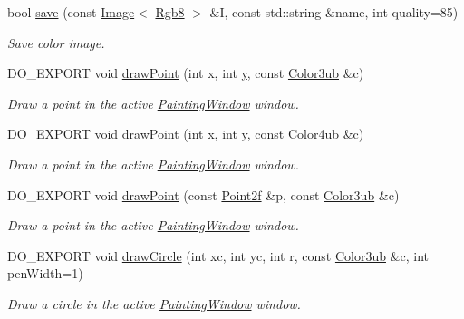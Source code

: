 \begin{DoxyCompactItemize}
bool \hyperlink{group___image_i_o_ga7aae26b551495f7b9992a69d6d80a9c0}{save} (const \hyperlink{class_d_o_1_1_image}{Image}$<$ \hyperlink{group___color_types_gabba376766e70e08cdaccf69fa903f526}{Rgb8} $>$ \&I, const std\-::string \&name, int quality=85)
\begin{DoxyCompactList}\small\item\em Save color image. \end{DoxyCompactList}\item 
D\-O\-\_\-\-E\-X\-P\-O\-R\-T void \hyperlink{group___draw2_d_gac5a7d7f69f27b67a54658d70fd2ecf92}{draw\-Point} (int x, int \hyperlink{group___channel_accessors_gac90c52c5b3a7b2a7e3761e6e84f25778}{y}, const \hyperlink{group___color_types_ga018b76cd00a4f9dca7dd06246d5bd3aa}{Color3ub} \&c)
\begin{DoxyCompactList}\small\item\em Draw a point in the active \hyperlink{class_d_o_1_1_painting_window}{Painting\-Window} window. \end{DoxyCompactList}\item 
D\-O\-\_\-\-E\-X\-P\-O\-R\-T void \hyperlink{group___draw2_d_ga404236e564421c6870b162167e459491}{draw\-Point} (int x, int \hyperlink{group___channel_accessors_gac90c52c5b3a7b2a7e3761e6e84f25778}{y}, const \hyperlink{group___color_types_ga546db612644ff4dcb8989ae595ec64f9}{Color4ub} \&c)
\begin{DoxyCompactList}\small\item\em Draw a point in the active \hyperlink{class_d_o_1_1_painting_window}{Painting\-Window} window. \end{DoxyCompactList}\item 
D\-O\-\_\-\-E\-X\-P\-O\-R\-T void \hyperlink{group___draw2_d_gafd722a4bc47cf9ce5110ee6b639b2b3f}{draw\-Point} (const \hyperlink{group___eigen_typedefs_ga02df8c02295a7722cc3f5b89e8137464}{Point2f} \&p, const \hyperlink{group___color_types_ga018b76cd00a4f9dca7dd06246d5bd3aa}{Color3ub} \&c)
\begin{DoxyCompactList}\small\item\em Draw a point in the active \hyperlink{class_d_o_1_1_painting_window}{Painting\-Window} window. \end{DoxyCompactList}\item 
D\-O\-\_\-\-E\-X\-P\-O\-R\-T void \hyperlink{group___draw2_d_ga752f49150f8f2f6ff00806fca131b86c}{draw\-Circle} (int xc, int yc, int r, const \hyperlink{group___color_types_ga018b76cd00a4f9dca7dd06246d5bd3aa}{Color3ub} \&c, int pen\-Width=1)
\begin{DoxyCompactList}\small\item\em Draw a circle in the active \hyperlink{class_d_o_1_1_painting_window}{Painting\-Window} window. \end{DoxyCompactList}\item 

\end{DoxyCompactItemize}
